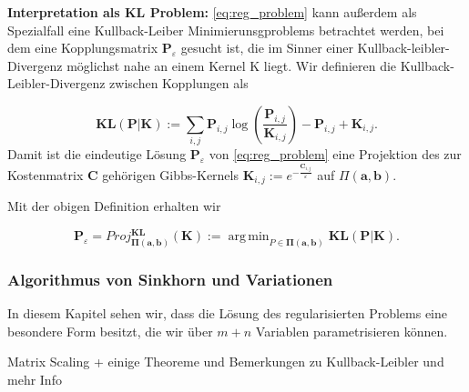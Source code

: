 \documentclass[11pt,a4paper]{article}
\DeclareMathOperator*{\argmin}{arg\,min}
\numberwithin{equation}{section}
\begin{document}
	\noindent \textbf{Interpretation als KL Problem:} \autoref{eq:reg_problem} kann außerdem als Spezialfall eine Kullback-Leiber Minimierunsgproblems betrachtet werden, bei dem eine Kopplungsmatrix $\boldsymbol{P}_\varepsilon$ gesucht ist, die im Sinner einer Kullback-leibler-Divergenz möglichst nahe an einem Kernel K liegt.
	Wir definieren die Kullback-Leibler-Divergenz zwischen Kopplungen als
	
	\begin{equation}
	\boldsymbol{KL}(\boldsymbol{P}|\boldsymbol{K}) := \sum_{i,j} \boldsymbol{P}_{i,j} \log \left(\frac{\boldsymbol{P}_{i,j}}{\boldsymbol{K}_{i,j}} \right) - \boldsymbol{P}_{i,j} + \boldsymbol{K}_{i,j}. \label{eq:KL_div_discrete}
	\end{equation}
	Damit ist die eindeutige Lösung $\boldsymbol{P}_\varepsilon$ von \autoref{eq:reg_problem} eine Projektion des zur Kostenmatrix $\boldsymbol{C}$ gehörigen Gibbs-Kernels $\boldsymbol{K}_{i,j} := e^{-\frac{\boldsymbol{C}_{i,j}}{\varepsilon}}$ auf $\Pi (\boldsymbol{a}, \boldsymbol{b})$.
	
	Mit der obigen Definition erhalten wir
	
	\begin{equation}
	\boldsymbol{P}_\varepsilon = Proj_{\boldsymbol{\Pi} (\boldsymbol{a}, \boldsymbol{b})}^{\boldsymbol{KL}}(\boldsymbol{K}) := \argmin_{P \in \boldsymbol{\Pi} (\boldsymbol{a}, \boldsymbol{b})}{\boldsymbol{KL}(\boldsymbol{P}|\boldsymbol{K})}.
	\end{equation}
	
	\subsubsection{Algorithmus von Sinkhorn und Variationen}
	In diesem Kapitel sehen wir, dass die Lösung des regularisierten Problems eine besondere Form besitzt, die wir über $m+n$ Variablen parametrisieren können.
	
	Matrix Scaling + einige Theoreme und Bemerkungen zu Kullback-Leibler und mehr Info \cite{vialard2019elementary}
	
\end{document}
